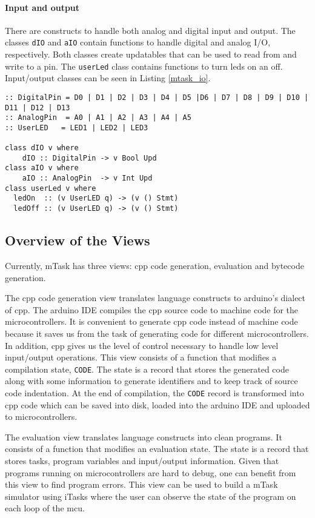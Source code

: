 \paragraph{Input and output} There are constructs to handle both analog and digital input and output. The classes \texttt{dIO} and \texttt{aIO} contain functions to handle digital and analog I/O, respectively. Both classes create updatables that can be used to read from and write to a pin. The \texttt{userLed} class contains functions to turn \acsp{led} on an off. Input/output classes can be seen in Listing \ref{mtask_io}. 

\begin{lstlisting}[caption=\gls{mTask} I/O classes,captionpos=b,label=mtask_io]
:: DigitalPin = D0 | D1 | D2 | D3 | D4 | D5 |D6 | D7 | D8 | D9 | D10 | D11 | D12 | D13
:: AnalogPin  = A0 | A1 | A2 | A3 | A4 | A5
:: UserLED   = LED1 | LED2 | LED3

class dIO v where
	dIO :: DigitalPin -> v Bool Upd
class aIO v where
	aIO :: AnalogPin  -> v Int Upd
class userLed v where
  ledOn  :: (v UserLED q) -> (v () Stmt)
  ledOff :: (v UserLED q) -> (v () Stmt)
\end{lstlisting}


\subsection{Overview of the Views}\label{sec:mtask_views}

Currently, \gls{mTask} has three views: \gls{cpp} code generation, evaluation and bytecode generation.

The \gls{cpp} code generation view translates language constructs to \gls{arduino}'s dialect of \gls{cpp}. The \gls{arduino} IDE compiles the \gls{cpp} source code to machine code for the microcontrollers. 
It is convenient to generate \gls{cpp} code instead of machine code because it saves us from the task of generating code for different microcontrollers. In addition, \gls{cpp} gives us the level of control necessary to handle low level input/output operations. This view consists of a function that modifies a compilation state, \texttt{CODE}. The state is a record that stores the generated code along with some information to generate identifiers and to keep track of source code indentation. At the end of compilation, the \texttt{CODE} record is transformed into \gls{cpp} code which can be saved into disk, loaded into the \gls{arduino} IDE and uploaded to microcontrollers.


The evaluation view translates language constructs into \gls{clean} programs. It consists of a function that modifies an evaluation state. The state is a record that stores tasks, program variables and input/output information. Given that programs running on microcontrollers are hard to debug, one can benefit from this view to find program errors. This view can be used to build a \gls{mTask} simulator using \gls{iTasks} where the user can observe the state of the program on each loop of the \gls{mcu}.

